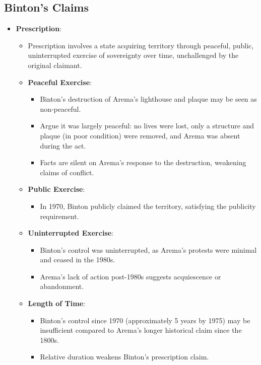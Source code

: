\subsection{Binton’s Claims}
\begin{itemize}
    \item \textbf{Prescription}:
    \begin{itemize}
        \item Prescription involves a state acquiring territory through peaceful, public, uninterrupted exercise of sovereignty over time, unchallenged by the original claimant.
        \item \textbf{Peaceful Exercise}:
        \begin{itemize}
            \item Binton’s destruction of Arema’s lighthouse and plaque may be seen as non-peaceful.
            \item Argue it was largely peaceful: no lives were lost, only a structure and plaque (in poor condition) were removed, and Arema was absent during the act.
            \item Facts are silent on Arema’s response to the destruction, weakening claims of conflict.
        \end{itemize}
        \item \textbf{Public Exercise}:
        \begin{itemize}
            \item In 1970, Binton publicly claimed the territory, satisfying the publicity requirement.
        \end{itemize}
        \item \textbf{Uninterrupted Exercise}:
        \begin{itemize}
            \item Binton’s control was uninterrupted, as Arema’s protests were minimal and ceased in the 1980s.
            \item Arema’s lack of action post-1980s suggests acquiescence or abandonment.
        \end{itemize}
        \item \textbf{Length of Time}:
        \begin{itemize}
            \item Binton’s control since 1970 (approximately 5 years by 1975) may be insufficient compared to Arema’s longer historical claim since the 1800s.
            \item Relative duration weakens Binton’s prescription claim.
        \end{itemize}

\end{itemize}
\end{itemize}
